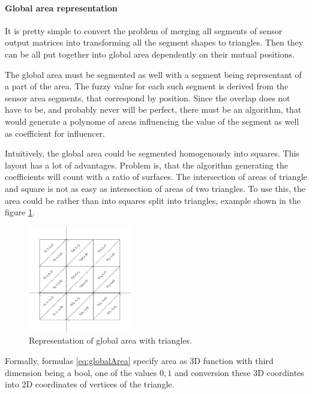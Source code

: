 \paragraph{Global area representation}
It is pretty simple to convert the problem of merging all segments of sensor output
matrices into transforming all the segment shapes to triangles. Then they can be 
all put together into global area dependently on their mutual positions.

The global area must be segmented as well with a segment being representant of a part
of the area. The fuzzy value for each such segment is derived from the sensor area segments,
that correspond by position. Since the overlap does not have to be, and probably never
will be perfect, there must be an algorithm, that would generate a polynome of areas
influencing the value of the segment as well as coefficient for influencer.

Intuitively, the global area could be segmented homogenously into squares. This layout
has a lot of advantages. Problem is, that the algorithm generating the coefficients will
count with a ratio of surfaces. The intersection of areas of triangle and square is not as easy
as intersection of areas of two triangles. To use this, the area could be rather than
into squares split into triangles, example shown in the figure \ref{fig:globalArea}.

\begin{figure}[!ht]
\begin{center}
\includegraphics[width=0.4\textwidth]{img/global_area.png}
\caption{Representation of global area with triangles.\label{fig:globalArea}}
\end{center}
\end{figure}

Formally, formulas \ref{eq:globalArea} specify area as 3D function with third dimension
being a bool, one of the values ${0,1}$ and conversion these 3D coordintes into
2D coordinates of vertices of the triangle.

